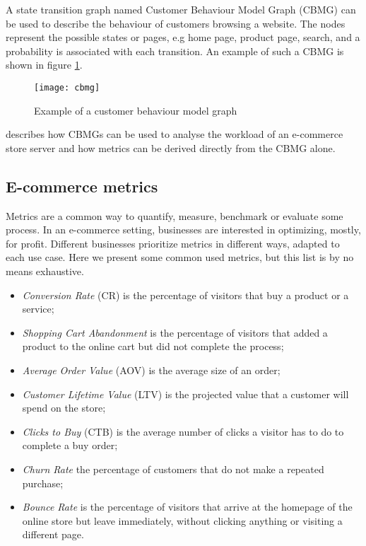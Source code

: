 A state transition graph named Customer Behaviour Model Graph (CBMG) can be 
used to describe the behaviour of customers browsing a website. The nodes 
represent the possible states or pages, e.g home page, product page, search, 
and a probability is associated with each transition. An example of such a CBMG 
is shown in figure \ref{fig:cbmg}.

\begin{figure}[h]
    \begin{center}
        \leavevmode
        \texttt{[image: cbmg]}
        \caption{Example of a customer behaviour model graph \cite{Menasce1999}}
        \label{fig:cbmg}
    \end{center}
\end{figure}

\cite{Menasce1999} describes how CBMGs can be used to analyse the workload of 
an e-commerce store server and how metrics can be derived directly from the 
CBMG alone.

\subsection{E-commerce metrics}

Metrics are a common way to quantify, measure, benchmark or evaluate some 
process. In an e-commerce setting, businesses are interested in optimizing, 
mostly, for profit. Different businesses prioritize metrics in different ways, 
adapted to each use case. Here we present some common used metrics, but this 
list is by no means exhaustive. \cite{Sterne2000, Menasce1999}

\begin{itemize}
    \item \textit{Conversion Rate} (CR) is the percentage of visitors that buy 
    a product or a service;
    \item \textit{Shopping Cart Abandonment} is the percentage of visitors that 
    added a product to the online cart but did not complete the process;
    \item \textit{Average Order Value} (AOV) is the average size of an order;
    \item \textit{Customer Lifetime Value} (LTV) is the projected value that a 
    customer will spend on the store;
    \item \textit{Clicks to Buy} (CTB) is the average number of clicks a 
    visitor has to do to complete a buy order;
    \item \textit{Churn Rate} the percentage of customers that do not make a 
    repeated purchase;
    \item \textit{Bounce Rate} is the percentage of visitors that arrive at the 
    homepage of the online store but leave immediately, without clicking 
    anything or visiting a different page.
\end{itemize}

